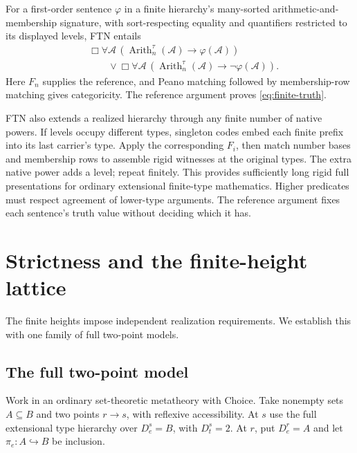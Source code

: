 \documentclass[11pt,letterpaper,numbers=noenddot]{scrartcl}
\numberwithin{equation}{section}
\theoremstyle{definition}
\newcommand{\Arith}{\operatorname{Arith}}
\begin{document}
For a first-order sentence $\varphi$ in a finite hierarchy's many-sorted arithmetic-and-membership signature, with sort-respecting equality and quantifiers restricted to its displayed levels, FTN entails
\begin{equation}\label{eq:finite-truth}
\begin{split}
&\Box\forall\mathcal A\,
 (\Arith_n^\tau(\mathcal A)\to\varphi(\mathcal A))\\
&\qquad{}\lor
\Box\forall\mathcal A\,
 (\Arith_n^\tau(\mathcal A)\to\neg\varphi(\mathcal A)).
\end{split}
\end{equation}
Here $F_n$ supplies the reference, and Peano matching followed by membership-row matching gives categoricity. The reference argument proves \eqref{eq:finite-truth}.

FTN also extends a realized hierarchy through any finite number of native powers. If levels occupy different types, singleton codes embed each finite prefix into its last carrier's type. Apply the corresponding $F_i$, then match number bases and membership rows to assemble rigid witnesses at the original types. The extra native power adds a level; repeat finitely. This provides sufficiently long rigid full presentations for ordinary extensional finite-type mathematics. Higher predicates must respect agreement of lower-type arguments. The reference argument fixes each sentence's truth value without deciding which it has.

\section{Strictness and the finite-height lattice}\label{sec:lattice}

The finite heights impose independent realization requirements. We establish this with one family of full two-point models.

\subsection{The full two-point model}

Work in an ordinary set-theoretic metatheory with Choice. Take nonempty sets $A\subseteq B$ and two points $r\to s$, with reflexive accessibility. At $s$ use the full extensional type hierarchy over $D_e^s=B$, with $D_t^s=2$. At $r$, put $D_e^r=A$ and let $\pi_e:A\hookrightarrow B$ be inclusion.
\end{document}
